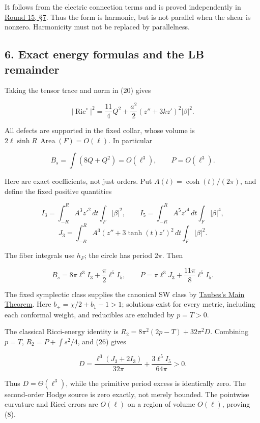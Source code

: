 \documentclass[
  11pt,
]{article}
\begin{document}
It follows from the electric connection terms and is proved
independently in \href{round15_rigidity.md}{Round 15, §7}. Thus the form
is harmonic, but is not parallel when the shear is nonzero. Harmonicity
must not be replaced by parallelness.

\hypertarget{exact-energy-formulas-and-the-lb-remainder}{%
\subsection{6. Exact energy formulas and the LB
remainder}\label{exact-energy-formulas-and-the-lb-remainder}}

Taking the tensor trace and norm in (20) gives

\[
 |\operatorname{Ric}^{\circ}|^2
 =\frac{11}{4}Q^2+\frac{a^2}{2}(z''+3kz')^2|\beta|^2.
 \tag{24}
\]

All defects are supported in the fixed collar, whose volume is
\(2\ell\sinh R\,\operatorname{Area}(F)=O(\ell)\). In particular

\[
 B_s=\int(8Q+Q^2)=O(\ell^3),\qquad P=O(\ell^3).
 \tag{25}
\]

Here are exact coefficients, not just orders. Put
\(A(t)=\cosh(t)/(2\pi)\), and define the fixed positive quantities

\[
 I_3=\int_{-R}^{R}A^3z'^2\,dt\int_F|\beta|^2,\qquad
 I_5=\int_{-R}^{R}A^5z'^4\,dt\int_F|\beta|^4,
\] \[
 J_3=\int_{-R}^{R}A^3(z''+3\tanh(t)z')^2\,dt\int_F|\beta|^2.
\]

The fiber integrals use \(h_F\); the circle has period \(2\pi\). Then

\[
 \boxed{B_s=8\pi\ell^3 I_3+\frac\pi2\ell^5 I_5,\qquad
 P=\pi\ell^3 J_3+\frac{11\pi}{8}\ell^5 I_5.}
 \tag{26}
\]

The fixed symplectic class supplies the canonical SW class by
\href{https://intlpress.com/site/pub/files/_fulltext/journals/mrl/1994/0001/0006/MRL-1994-0001-0006-a015.pdf}{Taubes's
Main Theorem}. Here \(b_+=\chi/2+b_1-1>1\); solutions exist for every
metric, including each conformal weight, and reducibles are excluded by
\(p=T>0\).

The classical Ricci-energy identity is \(R_2=8\pi^2(2p-T)+32\pi^2D\).
Combining \(p=T\), \(R_2=P+\int s^2/4\), and (26) gives

\[
 \boxed{D=\frac{\ell^3(J_3+2I_3)}{32\pi}
                +\frac{3\ell^5I_5}{64\pi}>0.}
 \tag{27}
\]

Thus \(D=\Theta(\ell^3)\), while the primitive period excess is
identically zero. The second-order Hodge source is zero exactly, not
merely bounded. The pointwise curvature and Ricci errors are \(O(\ell)\)
on a region of volume \(O(\ell)\), proving (8).
\end{document}
